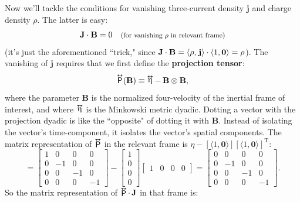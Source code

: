 \documentclass[12pt]{article}
\renewcommand{\vv}[1]{\mathbf{#1}}
\newcommand{\tightoverset}[2]{%
  \mathop{#2}\limits^{\vbox to -.5ex{\kern-0.75ex\hbox{$#1$}\vss}}}
\newcommand{\inlinedy}[1]{\tightoverset{\text{\tiny$\bm\leftrightarrow$}}{#1}}
\newcommand{\capdy}[1]{ \overset{ \text{\tiny$\bm\leftrightarrow$} }{\vphantom{\text{\small{A}}}\smash{#1}} }
\begin{document}
Now we'll tackle the conditions for vanishing three-current density $\vv j$ and charge density $\rho$. The latter is easy:
\begin{equation}\label{eq:noj}
\vv J \cdot \vv B = 0  \quad \text{\footnotesize{(for vanishing $\rho$ in relevant frame)}}
\end{equation}
(it's just the aforementioned ``trick," since $\vv J \cdot \vv B = \langle \rho, \mkern2mu \vv j \rangle \cdot \langle 1, \vv 0 \rangle = \rho$). The vanishing of $\vv j$ requires that we first define the \textbf{projection tensor}:
\begin{equation}\label{eq:projtens}
\capdy{\mathsf{P}} ( \vv B ) \equiv \inlinedy{\upeta} - \, \vv B \otimes \vv B ,
\end{equation}
where the parameter $\vv B$ is the normalized four-velocity of the inertial frame of interest, and where $\inlinedy{\upeta}$ is the Minkowski metric dyadic. Dotting a vector with the projection dyadic is like the ``opposite" of dotting it with $\vv B$. Instead of isolating the vector's time-component, it isolates the vector's spatial components. The matrix representation of $\inlinedy{\mathsf{P}}$ in the relevant frame is $\eta - [\langle 1, \vv 0 \rangle] [\langle 1, \vv 0 \rangle]^{\mathrm{T}}$:
\begin{equation*}
[\capdy{\mathsf{P}}]
=
\begin{bmatrix}
1 & 0 & 0 & 0 \\
0 & -1 & 0 & 0 \\
0 & 0 & -1 & 0 \\
0 & 0 & 0 & -1
\end{bmatrix}
-
\begin{bmatrix}
1 \\
0 \\
0 \\
0
\end{bmatrix}
\begin{bmatrix}
1 & 0 & 0 & 0
\end{bmatrix}
=
\begin{bmatrix}
0 & 0 & 0 & 0 \\
0 & -1 & 0 & 0 \\
0 & 0 & -1 & 0 \\
0 & 0 & 0 & -1
\end{bmatrix} .
\end{equation*}
So the matrix representation of $\inlinedy{\mathsf{P}} \cdot \, \vv J$ in that frame is:
\end{document}
